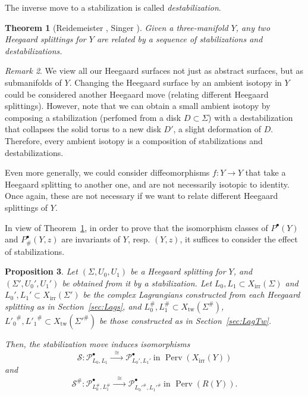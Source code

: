 \documentclass [11pt]{amsart}
\newtheorem {theorem}{Theorem}[section]
\newtheorem {proposition}[theorem]{Proposition}
\theoremstyle{remark}
\newtheorem {remark}[theorem]{Remark}
\def\Rep {R}
\def\Char {X}
\def\CharIrr {\Char_{\operatorname{irr}}}
\def\Stab{\mathscr{S}}
\def\Perv {\operatorname{Perv}}
\def\tw{\operatorname{tw}}
\def\Pb {\mathcal{P}^\bullet}
\begin{document}
The inverse move to a stabilization is called {\em destabilization}.

\begin{theorem}[Reidemeister \cite{Reidemeister}, Singer \cite{Singer}]
\label{thm:RS}
Given a three-manifold $Y$, any two Heegaard splittings for $Y$ are  related by a sequence of stabilizations and destabilizations.
\end{theorem}

\begin{remark}
\label{rem:ambient}
We view all our Heegaard surfaces not just as abstract surfaces, but as submanifolds of $Y$.  Changing the Heegaard surface by an ambient isotopy in $Y$ could be considered another Heegaard move (relating different Heegaard splittings). However, note that we can obtain a small ambient isotopy by composing a stabilization (perfomed from a disk $D \subset \Sigma$) with a destabilization that collapses the solid torus to a new disk $D'$, a slight deformation of $D$. Therefore, every ambient isotopy is a composition of  stabilizations and destabilizations.  

Even more generally, we could consider diffeomorphisms $f: Y \to Y$ that take a Heegaard splitting to another one, and are not necessarily isotopic to identity. Once again, these are not necessary if we  want to relate different Heegaard splittings of $Y$.
\end{remark}

In view of Theorem~\ref{thm:RS}, in order to prove that the isomorphism classes of $P^{\bullet}(Y)$ and $P^{\bullet}_\#(Y,z)$ are invariants of $Y$, resp. $(Y, z)$, it suffices to consider the effect of stabilizations.

\begin{proposition}
\label{prop:stab}
Let $(\Sigma, U_0, U_1)$ be a Heegaard splitting for $Y$, and $(\Sigma', U_0', U_1')$ be obtained from it by a stabilization. Let $L_0, L_1  \subset \CharIrr(\Sigma)$ and $L_0', L_1' \subset \CharIrr(\Sigma')$ be the complex Lagrangians constructed from each Heegaard splitting as in Section~\ref{sec:Lags}, and $L_0^{\#} , L_1^{\#} \subset  \Char_{\tw}(\Sigma^{\#})$, ${L'_0}^{\#} , {L'_1}^{\#} \subset  \Char_{\tw}({\Sigma'}^{\#})$ be those constructed as in Section~\ref{sec:LagTw}.

Then, the stabilization move induces isomorphisms
$$ \Stab: \Pb_{L_0, L_1} \xrightarrow{\phantom{b}\cong\phantom{b}}  \Pb_{L_0', L_1'} \ \text{in } \Perv(\CharIrr(Y))$$
and
$$ \Stab^{\#}:  \Pb_{L^{\#}_0, L^{\#}_1}  \xrightarrow{\phantom{b}\cong\phantom{b}}  \Pb_{{L_0'}^{\#}, {L_1'}^{\#}} \ \text{in } \Perv(\Rep(Y)).$$
\end{proposition}
\end{document}
